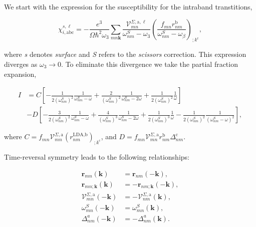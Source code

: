\documentclass[11pt]{article}
\begin{document}
We start with the expression for the susceptibility for the intraband transtitions,

\begin{equation}\label{chii}
\chi_{i,\text{a}\text{b}\text{c}}^{s,\ell}=-\frac{e^3}{\Omega\hbar^2\omega_3}\sum_{mn\mathbf{k}}\frac{\mathcal{V}_{mn}^{\Sigma,\text{a},\ell}}{\omega^S_{nm}-\omega_3}\left(\frac{f_{mn}r_{nm}^{\text{b}}}{\omega^S_{nm}-\omega_\beta}\right)_{;k^{\text{c}}},
\end{equation} 

where \emph{s} denotes \emph{surface} and \emph{S} refers to the \emph{scissors} correction. This expression diverges as $\omega_{3} \rightarrow 0$. To eliminate this divergence we take the partial fraction expansion,

\begin{align}\label{pfi} 
I &= C \left[-\frac{1}{2(\omega^{S}_{nm})^{2}}\frac{1}{\omega^{S}_{nm}-\omega}+\frac{2}{(\omega^{S}_{nm})^{2}}\frac{1}{\omega^{S}_{nm}-2\omega}+\frac{1}{2(\omega^{S}_{nm})^{2}}\frac{1}{\omega}\right]\nonumber\\
&- D \left[-\frac{3}{2(\omega^{S}_{nm})^{2}}\frac{1}{\omega^{S}_{nm}-\omega}+\frac{4}{(\omega^{S}_{nm})^{3}}\frac{1}{\omega^{S}_{nm}-2\omega}+\frac{1}{2(\omega^{S}_{nm})^{3}}\frac{1}{\omega}-\frac{1}{2(\omega^{S}_{nm})^{2}}\frac{1}{(\omega^{S}_{nm}-\omega)^2}\right],
\end{align} 

where $C = f_{mn}\mathcal{V}^{\Sigma,\text{a}}_{mn}(r^{\text{LDA},\text{b}}_{nm})_{;k^{\text{c}}}$, and $D=f_{mn}\mathcal{V}^{\Sigma,\text{a}}_{mn}r^{\text{b}}_{nm}\Delta^{\text{c}}_{nm}$.

Time-reversal symmetry leads to the following relationships:

\begin{align*}
\mathbf{r}_{mn}(\mathbf{k})                                 &=  \mathbf{r}_{nm}(-\mathbf{k}),                               \\
\mathbf{r}_{mn;\mathbf{k}}(\mathbf{k})                      &=  -\mathbf{r}_{nm;\mathbf{k}}(-\mathbf{k}),                   \\
\mathcal{V}^{\Sigma,\text{a}}_{mn}(-\mathbf{k})             &=  -\mathbf{\mathcal{V}}_{nm}^{\Sigma,\text{a}}(\mathbf{k}),   \\
\omega_{mn}^{S}(-\mathbf{k})                                &=  \omega_{mn}^{S}(\mathbf{k}),                                \\
\Delta^a_{nm}(-\mathbf{k})                                  &=  -\Delta^a_{nm}(\mathbf{k}).
\end{align*}
\end{document}
